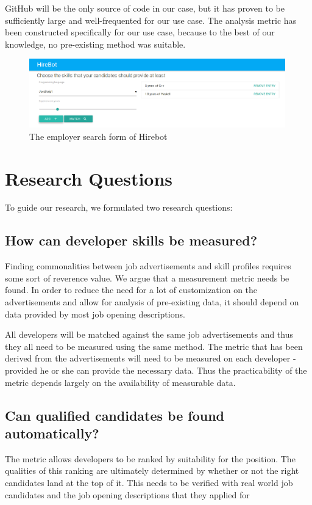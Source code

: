GitHub will be the only source of code in our case, but it has proven to be sufficiently large and well-frequented for our use case. The analysis metric has been constructed specifically for our use case, because to the best of our knowledge, no pre-existing method was suitable.

\begin{figure}
  \includegraphics[width=30em]{gfx/employerview.png}
  \caption{The employer search form of Hirebot}
  \label{fig:employerview}
\end{figure}

\section{Research Questions}\label{sec:research-questions}
To guide our research, we formulated two research questions:

\subsection{How can developer skills be measured?}\label{subsec:dev-skill-measurement}
Finding commonalities between job advertisements and skill profiles
requires some sort of reverence value. We argue that a measurement
metric needs be found.
In order to reduce the need for a lot of customization
on the advertisements and allow for  analysis of pre-existing data,
it should depend on data provided by most job opening descriptions.
\newline

All developers will be matched against the same job advertisements
and thus they all need to be measured using the same method.
The metric that has been derived from the advertisements will need to be
measured on each developer - provided he or she can provide the
necessary data. Thus the practicability of the metric depends largely on
the availability of measurable data.

\subsection{Can qualified candidates be found automatically?}\label{subsec:measurement-quality}
The metric allows developers to be ranked by suitability for the position.
The qualities of this ranking are ultimately determined by whether
or not the right candidates land at the top of it. This needs to be
verified with real world job candidates and the job opening descriptions
that they applied for

